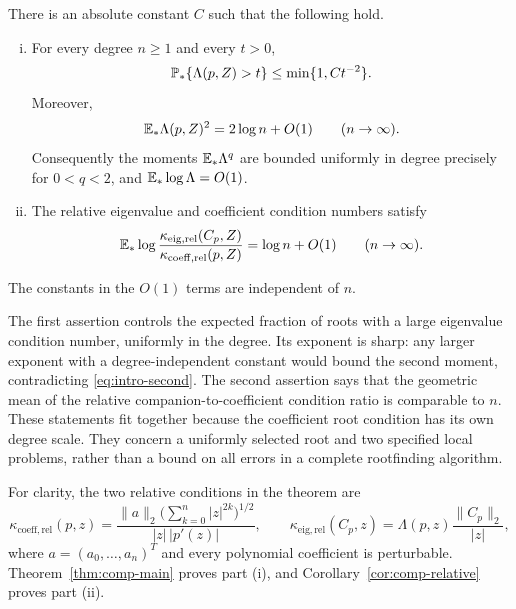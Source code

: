 \begin{theorem}\label{thm:intro-main}
There is an absolute constant $C$ such that the following hold.
\begin{enumerate}[(i)]
 \item For every degree $n\ge1$ and every $t>0$,
 \begin{equation}\label{eq:intro-tail}
   \mathbb P_*\{\Lambda(p,Z)>t\}\le\min\{1,Ct^{-2}\}.
 \end{equation}
 Moreover,
 \begin{equation}\label{eq:intro-second}
   \mathbb E_*\Lambda(p,Z)^2=2\log n+O(1)
   \qquad(n\to\infty).
 \end{equation}
 Consequently the moments $\mathbb E_*\Lambda^q$ are bounded uniformly in degree
 precisely for $0<q<2$, and $\mathbb E_*\log\Lambda=O(1)$.
 \item The relative eigenvalue and coefficient condition numbers satisfy
 \begin{equation}\label{eq:intro-relative}
   \mathbb E_*\log
   \frac{\kappa_{\mathrm{eig,rel}}(C_p,Z)}
        {\kappa_{\mathrm{coeff,rel}}(p,Z)}
   =\log n+O(1)
   \qquad(n\to\infty).
 \end{equation}
\end{enumerate}
The constants in the $O(1)$ terms are independent of $n$.
\end{theorem}

The first assertion controls the expected fraction of roots with a large
eigenvalue condition number, uniformly in the degree. Its exponent is sharp:
any larger exponent with a degree-independent constant would bound the second
moment, contradicting \eqref{eq:intro-second}. The second assertion says that
the geometric mean of the relative companion-to-coefficient condition ratio
is comparable to $n$. These statements fit together because the coefficient
root condition has its own degree scale. They concern a uniformly selected
root and two specified local problems, rather than a bound on all errors in
a complete rootfinding algorithm.

For clarity, the two relative conditions in the theorem are
\begin{equation}\label{eq:intro-relative-definitions}
 \kappa_{\mathrm{coeff,rel}}(p,z)
 =\frac{\|a\|_2\bigl(\sum_{k=0}^n|z|^{2k}\bigr)^{1/2}}
        {|z|\,|p'(z)|},\qquad
 \kappa_{\mathrm{eig,rel}}(C_p,z)
 =\Lambda(p,z)\frac{\|C_p\|_2}{|z|},
\end{equation}
where $a=(a_0,\ldots,a_n)^T$ and every polynomial coefficient is perturbable.
Theorem~\ref{thm:comp-main} proves part (i), and
Corollary~\ref{cor:comp-relative} proves part (ii).


